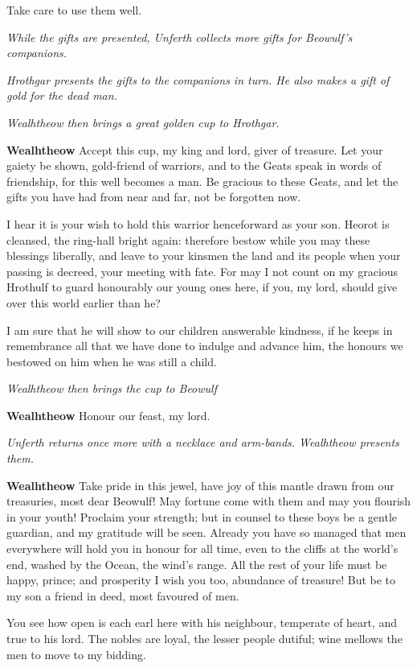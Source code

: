 \documentclass[a4paper]{article}
\begin{document}
{Take care to use them well.

\centerline{\textit{While the gifts are presented, Unferth collects more gifts for Beowulf's companions.}}
\centerline{\textit{Hrothgar presents the gifts to the companions in turn. He also makes a gift of gold for the dead man.}}

\centerline{\textit{Wealhtheow then brings a great golden cup to Hrothgar.}}

\textbf{Wealhtheow} Accept this cup, my king and lord,
giver of treasure. Let your gaiety be shown,
gold-friend of warriors, and to the Geats speak
in words of friendship, for this well becomes a man.
Be gracious to these Geats, and let the gifts you have had
from near and far, not be forgotten now.

I hear it is your wish to hold this warrior
henceforward as your son. Heorot is cleansed,
the ring-hall bright again: therefore bestow while you may
these blessings liberally, and leave to your kinsmen
the land and its people when your passing is decreed,
your meeting with fate. For may I not count
on my gracious Hrothulf to guard honourably
our young ones here, if you, my lord,
should give over this world earlier than he?

I am sure that he will show to our children
answerable kindness, if he keeps in remembrance
all that we have done to indulge and advance him,
the honours we bestowed on him when he was still a child.

\centerline{\textit{Wealhtheow then brings the cup to Beowulf}}

\textbf{Wealhtheow} Honour our feast, my lord.

\centerline{\textit{Unferth returns once more with a necklace and arm-bands. Wealhtheow presents them.}}

\textbf{Wealhtheow} Take pride in this jewel, have joy of this mantle
drawn from our treasuries, most dear Beowulf!
May fortune come with them and may you flourish in your youth!
Proclaim your strength; but in counsel to these boys
be a gentle guardian, and my gratitude will be seen.
Already you have so managed that men everywhere
will hold you in honour for all time,
even to the cliffs at the world’s end, washed by the Ocean,
the wind’s range. All the rest of your life
must be happy, prince; and prosperity I wish you too,
abundance of treasure! But be to my son
a friend in deed, most favoured of men.

You see how open is each earl here with his neighbour,
temperate of heart, and true to his lord.
The nobles are loyal, the lesser people dutiful;
wine mellows the men to move to my bidding.

}
\end{document}
